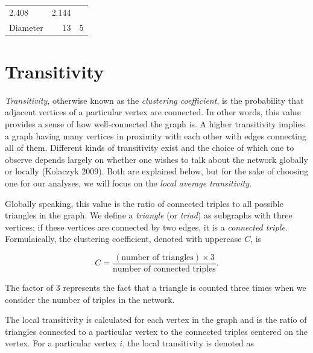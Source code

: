\documentclass[12pt,twoside]{amherstthesis}
\begin{document}
\begin{longtable}[]{@{}lrr@{}}
\begin{minipage}[t]{0.29\columnwidth}
  2.408\strut
  \end{minipage} & \begin{minipage}[t]{0.23\columnwidth}\raggedleft\strut
  2.144\strut
  \end{minipage}\tabularnewline
  \begin{minipage}[t]{0.29\columnwidth}\raggedright\strut
  Diameter\strut
  \end{minipage} & \begin{minipage}[t]{0.29\columnwidth}\raggedleft\strut
  13\strut
  \end{minipage} & \begin{minipage}[t]{0.23\columnwidth}\raggedleft\strut
  5\strut
  \end{minipage}\tabularnewline
  \bottomrule
  \end{longtable}
  
  \section{Transitivity}\label{transitivity}
  
  \emph{Transitivity}, otherwise known as the \emph{clustering
  coefficient}, is the probability that adjacent vertices of a particular
  vertex are connected. In other words, this value provides a sense of how
  well-connected the graph is. A higher transitivity implies a graph
  having many vertices in proximity with each other with edges connecting
  all of them. Different kinds of transitivity exist and the choice of
  which one to observe depends largely on whether one wishes to talk about
  the network globally or locally (Kolaczyk 2009). Both are explained
  below, but for the sake of choosing one for our analyses, we will focus
  on the \emph{local average transitivity}.
  
  Globally speaking, this value is the ratio of connected triples to all
  possible triangles in the graph. We define a \emph{triangle} (or
  \emph{triad}) as subgraphs with three vertices; if these vertices are
  connected by two edges, it is a \emph{connected triple}. Formulaically,
  the clustering coefficient, denoted with uppercase \(C\), is
  
  \[C = \frac {(\text{number of triangles}) \times 3} {\text{number of connected triples}}.\]
  
  The factor of \(3\) represents the fact that a triangle is counted three
  times when we consider the number of triples in the network.
  
  The local transitivity is calculated for each vertex in the graph and is
  the ratio of triangles connected to a particular vertex to the connected
  triples centered on the vertex. For a particular vertex \(i\), the local
  transitivity is denoted as
  
\end{document}
